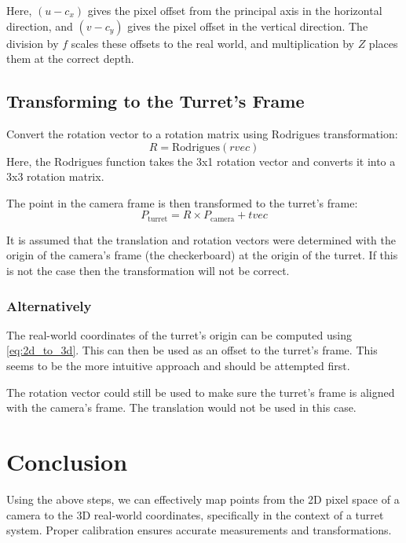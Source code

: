 Here, $(u - c_x)$ gives the pixel offset from the principal axis in the horizontal direction, and $(v - c_y)$ gives the pixel offset in the vertical direction. The division by $f$ scales these offsets to the real world, and multiplication by $Z$ places them at the correct depth.

\subsection{Transforming to the Turret's Frame}
Convert the rotation vector to a rotation matrix using Rodrigues transformation:
\[
    R = \text{Rodrigues}(rvec)
\]
Here, the Rodrigues function takes the 3x1 rotation vector and converts it into a 3x3 rotation matrix.

The point in the camera frame is then transformed to the turret's frame:
\[
    P_{\text{turret}} = R \times P_{\text{camera}} + tvec
\]

It is assumed that the translation and rotation vectors were determined with the origin of the camera's frame (the checkerboard) at the origin of the turret. If this is not the case then the transformation will not be correct.

\subsubsection*{Alternatively}
The real-world coordinates of the turret's origin can be computed using \ref{eq:2d_to_3d}. This can then be used as an offset to the turret's frame. This seems to be the more intuitive approach and should be attempted first.

The rotation vector could still be used to make sure the turret's frame is aligned with the camera's frame. The translation would not be used in this case.


\section{Conclusion}
Using the above steps, we can effectively map points from the 2D pixel space of a camera to the 3D real-world coordinates, specifically in the context of a turret system. Proper calibration ensures accurate measurements and transformations.
